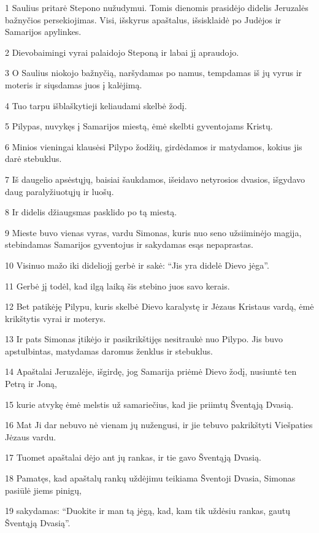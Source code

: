 \par 1 Saulius pritarė Stepono nužudymui. Tomis dienomis prasidėjo didelis Jeruzalės bažnyčios persekiojimas. Visi, išskyrus apaštalus, išsisklaidė po Judėjos ir Samarijos apylinkes. 
\par 2 Dievobaimingi vyrai palaidojo Steponą ir labai jį apraudojo. 
\par 3 O Saulius niokojo bažnyčią, naršydamas po namus, tempdamas iš jų vyrus ir moteris ir siųsdamas juos į kalėjimą. 
\par 4 Tuo tarpu išblaškytieji keliaudami skelbė žodį. 
\par 5 Pilypas, nuvykęs į Samarijos miestą, ėmė skelbti gyventojams Kristų. 
\par 6 Minios vieningai klausėsi Pilypo žodžių, girdėdamos ir matydamos, kokius jis darė stebuklus. 
\par 7 Iš daugelio apsėstųjų, baisiai šaukdamos, išeidavo netyrosios dvasios, išgydavo daug paralyžiuotųjų ir luošų. 
\par 8 Ir didelis džiaugsmas pasklido po tą miestą. 
\par 9 Mieste buvo vienas vyras, vardu Simonas, kuris nuo seno užsiiminėjo magija, stebindamas Samarijos gyventojus ir sakydamas esąs nepaprastas. 
\par 10 Visi­nuo mažo iki didelio­jį gerbė ir sakė: “Jis yra didelė Dievo jėga”. 
\par 11 Gerbė jį todėl, kad ilgą laiką šis stebino juos savo kerais. 
\par 12 Bet patikėję Pilypu, kuris skelbė Dievo karalystę ir Jėzaus Kristaus vardą, ėmė krikštytis vyrai ir moterys. 
\par 13 Ir pats Simonas įtikėjo ir pasikrikštijęs nesitraukė nuo Pilypo. Jis buvo apstulbintas, matydamas daromus ženklus ir stebuklus. 
\par 14 Apaštalai Jeruzalėje, išgirdę, jog Samarija priėmė Dievo žodį, nusiuntė ten Petrą ir Joną, 
\par 15 kurie atvykę ėmė melstis už samariečius, kad jie priimtų Šventąją Dvasią. 
\par 16 Mat Ji dar nebuvo nė vienam jų nužengusi, ir jie tebuvo pakrikštyti Viešpaties Jėzaus vardu. 
\par 17 Tuomet apaštalai dėjo ant jų rankas, ir tie gavo Šventąją Dvasią. 
\par 18 Pamatęs, kad apaštalų rankų uždėjimu teikiama Šventoji Dvasia, Simonas pasiūlė jiems pinigų, 
\par 19 sakydamas: “Duokite ir man tą jėgą, kad, kam tik uždėsiu rankas, gautų Šventąją Dvasią”. 

